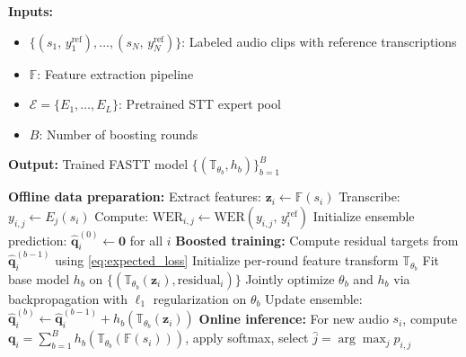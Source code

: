 \documentclass[journal]{IEEEtran}
\begin{document}
    \begin{algorithm}
        [t] \small
        \caption{Offline Training: FASTT for Differentiable Selectors}
        \label{alg:fasttsdt_training}

        \textbf{Inputs:}
        \begin{itemize}
            \item $\{(s_{1},\,y_1^{\mathrm{ref}}),\dots,(s_{N},\,y_N^{\mathrm{ref}})\}$: Labeled audio clips
                with reference transcriptions

            \item $\mathbb{F}$: Feature extraction pipeline

            \item $\mathcal{E}=\{E_{1},\dots,E_{L}\}$: Pretrained STT expert
                pool

            \item $B$: Number of boosting rounds
        \end{itemize}

        \textbf{Output:} Trained FASTT model $\{(\mathbb{T}_{\theta_b}, h_{b})\}_{b=1}^{B}$

        \begin{algorithmic}[1]
            \setcounter{ALG@line}{-1}
            \State \textbf{Offline data preparation:} 
            \State Extract features: $\mathbf{z}_{i}\gets \mathbb{F}(s_{i})$
             \State Transcribe:
            $y_{i,j}\gets E_{j}(s_{i})$ \State Compute: $\mathrm{WER}_{i,j}\gets
            \mathrm{WER}(y_{i,j},\,y_i^{\mathrm{ref}})$ \EndFor \EndFor \State Initialize ensemble
            prediction: $\hat{\mathbf{q}}^{(0)}_{i}\gets \mathbf{0}$ for all $i$
            \State \textbf{Boosted training:} 
            \State Compute residual targets from $\hat{\mathbf{q}}^{(b-1)}_{i}$
            using \eqref{eq:expected_loss} \State Initialize per-round feature transform
            $\mathbb{T}_{\theta_b}$ \State Fit base model $h_{b}$ on $\{(\mathbb{T}
            _{\theta_b}(\mathbf{z}_{i}), \text{residual}_{i})\}$ \State Jointly optimize
            $\theta_{b}$ and $h_{b}$ via backpropagation with $\ell_{1}$ regularization
            on $\theta_{b}$ \State Update ensemble:
            $\hat{\mathbf{q}}^{(b)}_{i}\gets \hat{\mathbf{q}}^{(b-1)}_{i}+ h_{b}(\mathbb{T}_{\theta_b}(\mathbf{z}_{i}))$
            \EndFor \State \textbf{Online inference:} For new audio $s_{i}$,
            compute
            $\mathbf{q}_{i}= \sum_{b=1}^{B}h_{b}(\mathbb{T}_{\theta_b}(\mathbb{F}(s_{i})))$, apply softmax, select $\hat{j}= \arg\max_{j}p_{i,j}$
        \end{algorithmic}
    \end{algorithm}
\end{document}
